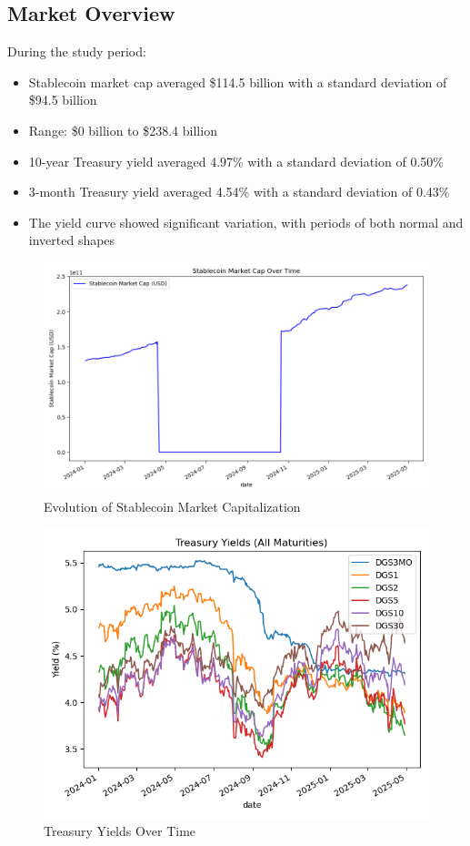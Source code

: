 \documentclass[12pt,a4paper]{article}
\begin{document}
\subsection{Market Overview}
During the study period:
\begin{itemize}
    \item Stablecoin market cap averaged \$114.5 billion with a standard deviation of \$94.5 billion
    \item Range: \$0 billion to \$238.4 billion
    \item 10-year Treasury yield averaged 4.97\% with a standard deviation of 0.50\%
    \item 3-month Treasury yield averaged 4.54\% with a standard deviation of 0.43\%
    \item The yield curve showed significant variation, with periods of both normal and inverted shapes
\end{itemize}

\begin{figure}[H]
    \centering
    \includegraphics[width=\columnwidth]{figures/stablecoin_market_cap.png}
    \caption{Evolution of Stablecoin Market Capitalization}
    \label{fig:market_cap}
\end{figure}

\begin{figure}[H]
    \centering
    \includegraphics[width=\columnwidth]{figures/treasury_yields_all.png}
    \caption{Treasury Yields Over Time}
    \label{fig:yields}
\end{figure}
\end{document}
